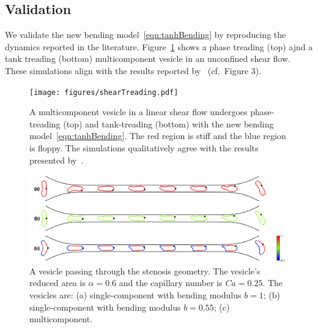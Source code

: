\documentclass[twoside,twocolumn,9pt]{article}
\newcommand{\subfigimg}[3][,]{%
  \setbox1=\hbox{\texttt{[image: \#3]}}%
  \leavevmode\rlap{\usebox1}%
  \rlap{\hspace*{0pt}\raisebox{\dimexpr\ht1-0\baselineskip}{\bf
  \normalsize #2}}%
  \phantom{\usebox1}%
}
\begin{document}
\subsection{Validation}
\label{sec:validation}
We validate the new bending model~\eqref{eqn:tanhBending} by reproducing
the dynamics reported in the literature. Figure~\ref{fig:treading} shows
a phase treading (top) ajnd a tank treading (bottom) multicomponent
vesicle in an unconfined shear flow. These simulations align with the
results reported by~\citet{liu-mar-li-vee-low2017} (cf.~Figure 3).
\begin{figure}[h]
  \centering
  \texttt{[image: figures/shearTreading.pdf]}
  \caption{\label{fig:treading} \small A multicomponent vesicle in a
  linear shear flow undergoes phase-treading (top) and tank-treading
  (bottom) with the new bending model~\eqref{eqn:tanhBending}. The red
  region is stiff and the blue region is floppy. The simulations
  qualitatively agree with the results presented
  by~\citet{liu-mar-li-vee-low2017}.}
\end{figure}


\begin{figure}[h]
  \centering
  \includegraphics[width=0.9\linewidth]{figures/STENOSIS_RAp6MCp5.pdf}
  \caption{\label{fig:RA6} \small A vesicle passing through the stenosis
  geometry. The vesicle's reduced area is $\alpha = 0.6$ and the
  capillary number is $Ca = 0.25$. The vesicles are: (a)
  single-component with bending modulus $b=1$; (b) single-component with
  bending modulus $b=0.55$; (c) multicomponent.}
\end{figure}
\end{document}

